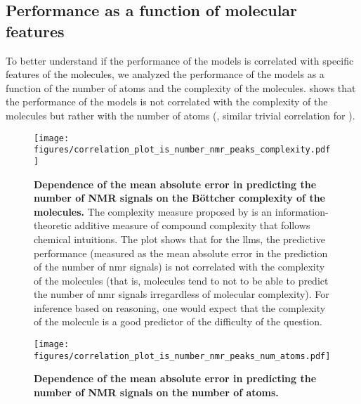 \clearpage

\subsection{Performance as a function of molecular features} \label{sec:molecular_features}
To better understand if the performance of the models is correlated with specific features of the molecules, we analyzed the performance of the models as a function of the number of atoms and the complexity of the molecules.
 shows that the performance of the models is not correlated with the complexity of the molecules but rather with the number of atoms (, similar trivial correlation for ).

\begin{figure}[!h]
    \centering
    \texttt{[image: figures/correlation\_plot\_is\_number\_nmr\_peaks\_complexity.pdf]}
    \caption{\textbf{Dependence of the mean absolute error in predicting the number of NMR signals on the Böttcher complexity of the molecules.} The complexity measure proposed by \textcite{B_ttcher_2016} is an information-theoretic additive measure of compound complexity that follows chemical intuitions.
    The plot shows that for the \glspl{llm}, the predictive performance (measured as the mean absolute error in the prediction of the number of \gls{nmr} signals) is not correlated with the complexity of the molecules (that is, molecules tend to not to be able to predict the number of \gls{nmr} signals irregardless of molecular complexity). For inference based on reasoning, one would expect that the complexity of the molecule is a good predictor of the difficulty of the question.}
    \label{fig:correlation_plot_is_number_nmr_peaks_complexity}
\end{figure}

\begin{figure}[!h]
    \centering
    \texttt{[image: figures/correlation\_plot\_is\_number\_nmr\_peaks\_num\_atoms.pdf]}
    \caption{\textbf{Dependence of the mean absolute error in predicting the number of NMR signals on the number of atoms.} }
    \label{fig:correlation_plot_is_number_nmr_peaks_num_atoms}
\end{figure}


